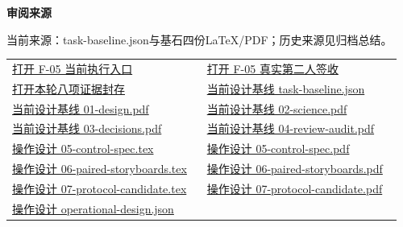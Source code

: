 \documentclass[11pt,a4paper]{article}
\newcommand{\reviewsubsection}[1]{\par\Needspace{4\baselineskip}\vspace{4pt}\begin{center}{\titlelatin\titlecjk\bfseries\fontsize{12}{18}\selectfont #1}\end{center}}
\begin{document}
\begin{minipage}{\linewidth}
\reviewsubsection{3.4 审阅来源}
当前来源：task-\allowbreak{}baseline.json与基石四份LaTeX/\allowbreak{}PDF；历史来源见归档总结。


\begingroup\small\setlength{\tabcolsep}{4pt}\begin{tabular}{@{}p{0.48\linewidth}p{0.48\linewidth}@{}}
\href{file:///D:/Agent/srp/agent/tasks/F-05/execution/README.md}{打开 F-\allowbreak{}05 当前执行入口} & \href{file:///D:/Agent/srp/agent/validation/F-05_\%E7\%AC\%AC\%E4\%BA\%8C\%E4\%BA\%BA\%E5\%AE\%A1\%E6\%A0\%B8\%E6\%8A\%A5\%E5\%91\%8A_\%E5\%B7\%B2\%E7\%AD\%BE\%E7\%BD\%B2.md}{打开 F-\allowbreak{}05 真实第二人签收}\\[4pt]
\href{file:///D:/Agent/srp/agent/tasks/F-05/evidence/runtime/evidence_manifest.json}{打开本轮八项证据封存} & \href{file:///D:/Agent/srp/agent/design/design-foundation-20261008/task-baseline.json}{当前设计基线 task-\allowbreak{}baseline.json}\\[4pt]
\href{file:///D:/Agent/srp/agent/design/design-foundation-20261008/01-design.pdf}{当前设计基线 01-\allowbreak{}design.pdf} & \href{file:///D:/Agent/srp/agent/design/design-foundation-20261008/02-science.pdf}{当前设计基线 02-\allowbreak{}science.pdf}\\[4pt]
\href{file:///D:/Agent/srp/agent/design/design-foundation-20261008/03-decisions.pdf}{当前设计基线 03-\allowbreak{}decisions.pdf} & \href{file:///D:/Agent/srp/agent/design/design-foundation-20261008/04-review-audit.pdf}{当前设计基线 04-\allowbreak{}review-\allowbreak{}audit.pdf}\\[4pt]
\href{file:///D:/Agent/srp/agent/design/design-foundation-20261008/05-control-spec.tex}{操作设计 05-\allowbreak{}control-\allowbreak{}spec.tex} & \href{file:///D:/Agent/srp/agent/design/design-foundation-20261008/05-control-spec.pdf}{操作设计 05-\allowbreak{}control-\allowbreak{}spec.pdf}\\[4pt]
\href{file:///D:/Agent/srp/agent/design/design-foundation-20261008/06-paired-storyboards.tex}{操作设计 06-\allowbreak{}paired-\allowbreak{}storyboards.tex} & \href{file:///D:/Agent/srp/agent/design/design-foundation-20261008/06-paired-storyboards.pdf}{操作设计 06-\allowbreak{}paired-\allowbreak{}storyboards.pdf}\\[4pt]
\href{file:///D:/Agent/srp/agent/design/design-foundation-20261008/07-protocol-candidate.tex}{操作设计 07-\allowbreak{}protocol-\allowbreak{}candidate.tex} & \href{file:///D:/Agent/srp/agent/design/design-foundation-20261008/07-protocol-candidate.pdf}{操作设计 07-\allowbreak{}protocol-\allowbreak{}candidate.pdf}\\[4pt]
\href{file:///D:/Agent/srp/agent/design/design-foundation-20261008/operational-design.json}{操作设计 operational-\allowbreak{}design.json} & \\[4pt]
\end{tabular}\endgroup\end{minipage}\par
\end{document}

